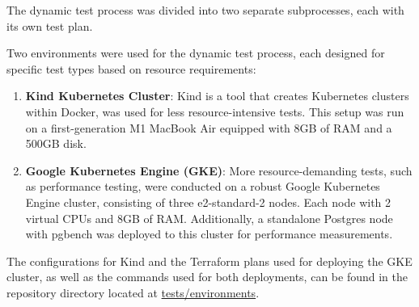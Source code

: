 


The dynamic test process was divided into two separate subprocesses, each with its own
test plan.

Two environments were used for the dynamic test process, each designed for specific test types based on resource requirements:

\begin{enumerate}
    \item \textbf{Kind Kubernetes Cluster}: Kind is a tool that creates Kubernetes clusters within Docker, was used for less resource-intensive tests. This setup was run on a first-generation M1 MacBook Air equipped with 8GB of RAM and a 500GB disk.
    \item \textbf{Google Kubernetes Engine (GKE)}: More resource-demanding tests, such as performance testing, were conducted on a robust Google Kubernetes Engine cluster, consisting of three e2-standard-2 nodes. Each node with 2 virtual CPUs and 8GB of RAM. Additionally, a standalone Postgres node with pgbench was deployed to this cluster for performance measurements.
\end{enumerate}

The configurations for Kind and the Terraform plans used for deploying the GKE cluster, as well as the commands used for both deployments, can be found in the repository directory located at \url{tests/environments}.

